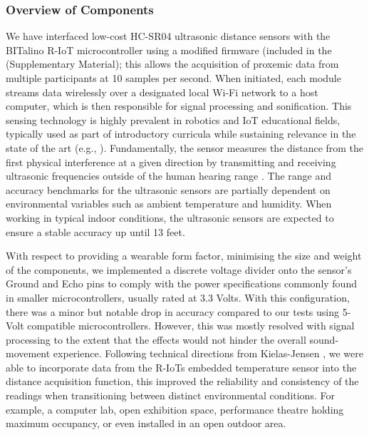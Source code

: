 \subsubsection{Overview of Components}

We have interfaced low-cost HC-SR04 ultrasonic distance sensors with the BITalino R-IoT microcontroller using a modified firmware (included in the (Supplementary Material); this allows the acquisition of proxemic data from multiple participants at 10 samples per second. When initiated, each module streams data wirelessly over a designated local Wi-Fi network to a host computer, which is then responsible for signal processing and sonification. This sensing technology is highly prevalent in robotics and IoT educational fields, typically used as part of introductory curricula \citep{hernandez-barrera_teaching_2014,garcia-ruiz_integrating_2018} while sustaining relevance in the state of the art (e.g., \cite{eguchi_proto-chair_2020,xu_analyzing_2018}). Fundamentally, the sensor measures the distance from the first physical interference at a given direction by transmitting and receiving ultrasonic frequencies outside of the human hearing range \citep{pal_distance_2015}. The range and accuracy benchmarks for the ultrasonic sensors are partially dependent on environmental variables such as ambient temperature and humidity. When working in typical indoor conditions, the ultrasonic sensors are expected to ensure a stable accuracy up until 13 feet.

With respect to providing a wearable form factor, minimising the size and weight of the components, we implemented a discrete voltage divider onto the sensor’s Ground and Echo pins to comply with the power specifications commonly found in smaller microcontrollers, usually rated at 3.3 Volts. With this configuration, there was a minor but notable drop in accuracy compared to our tests using 5-Volt compatible microcontrollers. However, this was mostly resolved with signal processing to the extent that the effects would not hinder the overall sound-movement experience. Following technical directions from Kielas-Jensen \citep{magicbycalvin_improve_nodate}, we were able to incorporate data from the R-IoTs embedded temperature sensor into the distance acquisition function, this improved the reliability and consistency of the readings when transitioning between distinct environmental conditions. For example, a computer lab, open exhibition space, performance theatre holding maximum occupancy, or even installed in an open outdoor area.  

